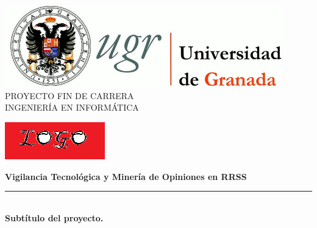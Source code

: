  
 
\setlength{\centeroffset}{-0.5\oddsidemargin}
\addtolength{\centeroffset}{0.5\evensidemargin}
\thispagestyle{empty}

\noindent\hspace*{\centeroffset}\begin{minipage}{\textwidth}

\centering
\includegraphics[width=0.9\textwidth]{imagenes/logo_ugr.jpg}\\[1.4cm]

\textsc{ \Large PROYECTO FIN DE CARRERA\\[0.2cm]}
\textsc{ INGENIERÍA EN INFORMÁTICA}\\[1cm]
% 

 \vspace{3.3cm}

\includegraphics{imagenes/logo.png} 
 \vspace{0.5cm}


{\Huge\bfseries Vigilancia Tecnológica y Minería de Opiniones en RRSS\\
}
\noindent\rule[-1ex]{\textwidth}{3pt}\\[3.5ex]
{\large\bfseries Subtítulo del proyecto.\\[4cm]}
\end{minipage}

